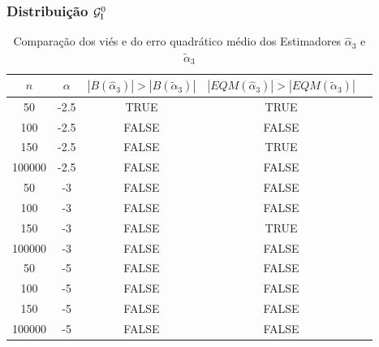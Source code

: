 \begin{frame}
\frametitle{Distribuição $\mathcal{G}_{\rm I}^{0}$}
{\tiny \begin{table}[h]
\caption{\scriptsize Comparação dos viés e do erro quadrático médio dos Estimadores $\widehat{\alpha}_3$ e $\widetilde{\alpha}_3$}
\centering
\begin{tabular}{|c|c|c|c|c|}\hline
$n$ & $\alpha$  & $|B(\widehat{\alpha}_3)|>|B(\widetilde{\alpha}_3)|$ & $|EQM(\widehat{\alpha}_3)|>|EQM(\widetilde{\alpha}_3)|$\\\hline
50     & -2.5  & TRUE  & TRUE\\\hline
100    & -2.5  & FALSE & FALSE\\\hline
150    & -2.5  & FALSE & TRUE\\\hline
100000 & -2.5  & FALSE & FALSE\\\hline
50     & -3    & FALSE & FALSE\\\hline
100    & -3    & FALSE & FALSE\\\hline
150    & -3    & FALSE & TRUE\\\hline
100000 & -3    & FALSE & FALSE\\\hline
50     & -5    & FALSE & FALSE\\\hline
100    & -5    & FALSE & FALSE\\\hline
150    & -5    & FALSE & FALSE\\\hline
100000 & -5    & FALSE & FALSE\\\hline
\end{tabular}
\end{table}
}
\end{frame}